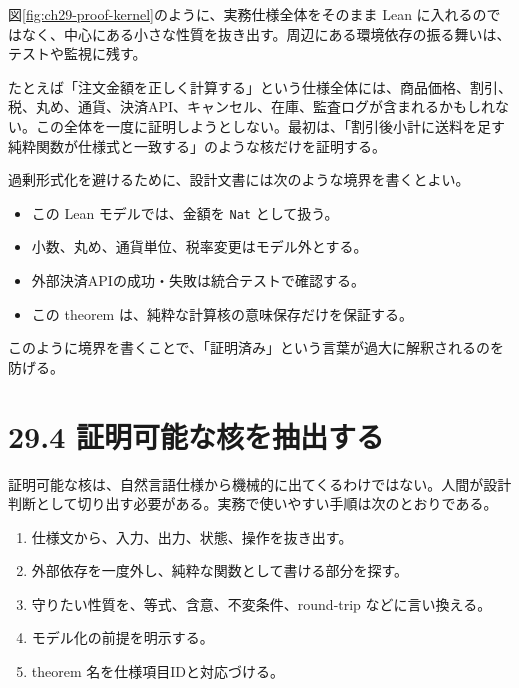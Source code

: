
図\ref{fig:ch29-proof-kernel}のように、実務仕様全体をそのまま Lean に入れるのではなく、中心にある小さな性質を抜き出す。周辺にある環境依存の振る舞いは、テストや監視に残す。

\begin{softwarebox}
たとえば「注文金額を正しく計算する」という仕様全体には、商品価格、割引、税、丸め、通貨、決済API、キャンセル、在庫、監査ログが含まれるかもしれない。この全体を一度に証明しようとしない。最初は、「割引後小計に送料を足す純粋関数が仕様式と一致する」のような核だけを証明する。
\end{softwarebox}

過剰形式化を避けるために、設計文書には次のような境界を書くとよい。

\begin{itemize}
\item この Lean モデルでは、金額を \texttt{Nat} として扱う。
\item 小数、丸め、通貨単位、税率変更はモデル外とする。
\item 外部決済APIの成功・失敗は統合テストで確認する。
\item この theorem は、純粋な計算核の意味保存だけを保証する。
\end{itemize}

このように境界を書くことで、「証明済み」という言葉が過大に解釈されるのを防げる。

\section{29.4 証明可能な核を抽出する}

証明可能な核は、自然言語仕様から機械的に出てくるわけではない。人間が設計判断として切り出す必要がある。実務で使いやすい手順は次のとおりである。

\begin{enumerate}
\item 仕様文から、入力、出力、状態、操作を抜き出す。
\item 外部依存を一度外し、純粋な関数として書ける部分を探す。
\item 守りたい性質を、等式、含意、不変条件、round-trip などに言い換える。
\item モデル化の前提を明示する。
\item theorem 名を仕様項目IDと対応づける。
\end{enumerate}

